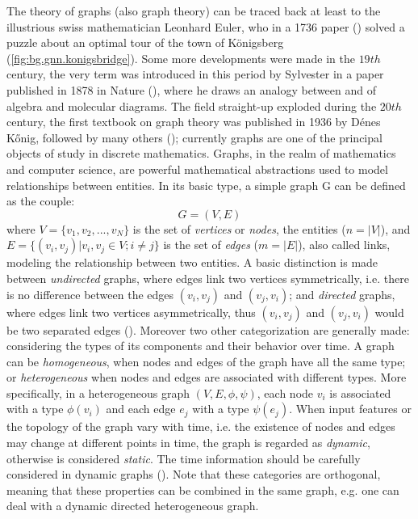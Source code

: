 \documentclass[binding=0.6cm]{sapthesis}
\newcommand{\mycite}[1]{(\cite{#1})}
\begin{document}
The theory of graphs (also graph theory) can be traced back at least to the illustrious swiss mathematician Leonhard Euler, who in a 1736 paper \mycite{gazette_1987} solved a puzzle about an optimal tour of the town of Königsberg (\cref{fig:bg.gnn.konigsbridge}). Some more developments were made in the $19th$ century, the very term  was introduced in this period by Sylvester in a paper published in 1878 in Nature \mycite{Sylvester1878ChemistryAA}, where he draws an analogy between  and  of algebra and molecular diagrams. The field straight-up exploded during the $20th$ century, the first textbook on graph theory was published in 1936 by Dénes Kőnig, followed by many others \mycite{tutte2001graph}; currently graphs are one of the principal objects of study in discrete mathematics. Graphs, in the realm of mathematics and computer science, are powerful mathematical abstractions used to model relationships between entities. In its basic type, a simple graph G can be defined as the couple:
\begin{equation}
    \label{eq:bg.gnn.graph-def}
    G = (V,E)
\end{equation}
where $V = \{v_1,v_2,...,v_N\}$ is the set of \textit{vertices} or \textit{nodes}, the entities ($n = |V|$), and $E = \{(v_i,v_j) | v_i,v_j \in V; i \ne j\}$ is the set of \textit{edges} ($m = |E|$), also called links, modeling the relationship between two entities. A basic distinction is made between \textit{undirected} graphs, where edges link two vertices symmetrically, i.e. there is no difference between the edges $(v_i,v_j)$ and $(v_j,v_i)$; and \textit{directed} graphs, where edges link two vertices asymmetrically, thus $(v_i,v_j)$ and $(v_j,v_i)$ would be two separated edges \mycite{cormen2022introduction}. Moreover two other categorization are generally made: considering the types of its components and their behavior  over time. 
A graph can be \textit{homogeneous}, when nodes and edges of the graph have all the same type; or \textit{heterogeneous} when nodes and edges are associated with different types. More specifically, in a heterogeneous graph $(V, E, \phi, \psi)$, each node $v_i$ is associated with a type $\phi(v_i)$ and each edge $e_j$ with a type $\psi(e_j)$. 
When input features or the topology of the graph vary with time, i.e. the existence of nodes and edges may change at different points in time, the graph is regarded as \textit{dynamic}, otherwise is considered \textit{static}. The time information should be carefully considered in dynamic graphs \mycite{zhou2021graph,wang2021mthetgnn}. Note that these categories are orthogonal, meaning that these properties can be combined in the same graph, e.g. one can deal with a dynamic directed heterogeneous graph.
\end{document}
